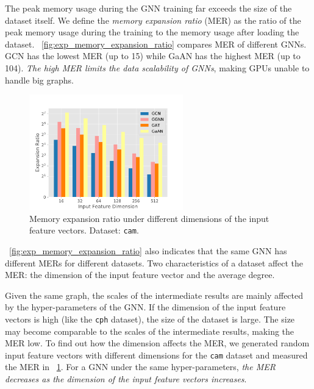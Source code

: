 The peak memory usage during the GNN training far exceeds the size of the dataset itself.
We define the \emph{memory expansion ratio} (MER) as the ratio of the peak memory usage during the training to the memory usage after loading the dataset.
\figurename~\ref{fig:exp_memory_expansion_ratio} compares MER of different GNNs.
GCN has the lowest MER (up to 15) while GaAN has the highest MER (up to 104).
\emph{The high MER limits the data scalability of GNNs}, making GPUs unable to handle big graphs.

\begin{figure}
    \centering
    \includegraphics[height=5cm]{figs/experiments/exp_memory_expansion_ratio_input_feature_dimension_com-amazon.pdf}
    \caption{Memory expansion ratio under different dimensions of the input feature vectors. Dataset: \texttt{cam}.}
    \label{fig:exp_memory_expension_ratio_input_feature_dimension}
\end{figure}

\figurename~\ref{fig:exp_memory_expansion_ratio} also indicates that the same GNN has different MERs for different datasets.
Two characteristics of a dataset affect the MER: the dimension of the input feature vector and the average degree.

Given the same graph, the scales of the intermediate results are mainly affected by the hyper-parameters of the GNN.
If the dimension of the input feature vectors is high (like the \texttt{cph} dataset), the size of the dataset is large.
The size may become comparable to the scales of the intermediate results,  making the MER low.
To find out how the dimension affects the MER, we generated random input feature vectors with different dimensions for the \texttt{cam} dataset and measured the MER in \figurename~\ref{fig:exp_memory_expension_ratio_input_feature_dimension}.
For a GNN under the same hyper-parameters, \emph{the MER decreases as the dimension of the input feature vectors increases}.

